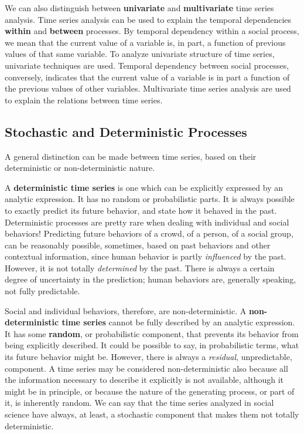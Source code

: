 \documentclass[
]{article}
\begin{document}
We can also distinguish between \textbf{univariate} and \textbf{multivariate} time series analysis. Time series analysis can be used to explain the temporal dependencies \textbf{within} and \textbf{between} processes. By temporal dependency within a social process, we mean that the current value of a variable is, in part, a function of previous values of that same variable. To analyze univariate structure of time series, univariate techniques are used. Temporal dependency between social processes, conversely, indicates that the current value of a variable is in part a function of the previous values of other variables. Multivariate time series analysis are used to explain the relations between time series.

\hypertarget{stochastic-and-deterministic-processes}{%
\subsection{Stochastic and Deterministic Processes}\label{stochastic-and-deterministic-processes}}

A general distinction can be made between time series, based on their deterministic or non-deterministic nature.

A \textbf{deterministic time series} is one which can be explicitly expressed by an analytic expression. It has no random or probabilistic parts. It is always possible to exactly predict its future behavior, and state how it behaved in the past. Deterministic processes are pretty rare when dealing with individual and social behaviors! Predicting future behaviors of a crowd, of a person, of a social group, can be reasonably possible, sometimes, based on past behaviors and other contextual information, since human behavior is partly \emph{influenced} by the past. However, it is not totally \emph{determined} by the past. There is always a certain degree of uncertainty in the prediction; human behaviors are, generally speaking, not fully predictable.

Social and individual behaviors, therefore, are non-deterministic. A \textbf{non-deterministic time series} cannot be fully described by an analytic expression. It has some \textbf{random}, or probabilistic component, that prevents its behavior from being explicitly described. It could be possible to say, in probabilistic terms, what its future behavior might be. However, there is always a \emph{residual}, unpredictable, component. A time series may be considered non-deterministic also because all the information necessary to describe it explicitly is not available, although it might be in principle, or because the nature of the generating process, or part of it, is inherently random. We can say that the time series analyzed in social science have always, at least, a stochastic component that makes them not totally deterministic.
\end{document}
